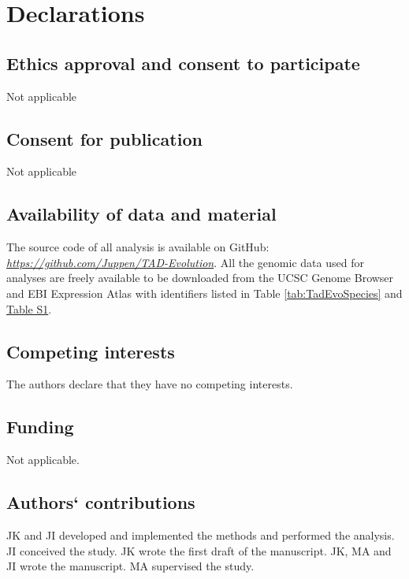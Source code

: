 \documentclass[a4paper,twoside=true,openright,parskip=full,chapterprefix=true,11pt,headings=normal,bibliography=totoc,listof=totoc,titlepage=on,captions=tableabove,draft=false]{scrreprt}
\theoremstyle{definition}
\theoremstyle{definition}
\theoremstyle{definition}
\theoremstyle{remark}
\begin{document}
\section{Declarations}\label{declarations}

\subsection{Ethics approval and consent to
participate}\label{ethics-approval-and-consent-to-participate}

Not applicable

\subsection{Consent for publication}\label{consent-for-publication}

Not applicable

\subsection{Availability of data and
material}\label{availability-of-data-and-material}

The source code of all analysis is available on GitHub:
\href{https://github.com/Juppen/TAD-Evolution}{\emph{https://github.com/Juppen/TAD-Evolution}}.
All the genomic data used for analyses are freely available to be
downloaded from the UCSC Genome Browser and EBI Expression Atlas with
identifiers listed in Table \ref{tab:TadEvoSpecies} and
\protect\hyperlink{TadEvoSupTab}{Table S1}.

\subsection{Competing interests}\label{competing-interests}

The authors declare that they have no competing interests.

\subsection{Funding}\label{funding}

Not applicable.

\subsection{Authors` contributions}\label{authors-contributions}

JK and JI developed and implemented the methods and performed the
analysis. JI conceived the study. JK wrote the first draft of the
manuscript. JK, MA and JI wrote the manuscript. MA supervised the study.
\end{document}
